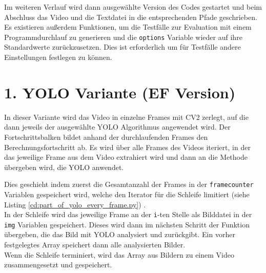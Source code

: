 {	\ifimportant
	
	\fi
	Im weiteren Verlauf wird dann ausgewählte Version des Codes gestartet und beim Abschluss das Video und die Textdatei in die entsprechenden Pfade geschrieben.
	Es existieren außerdem Funktionen, um die Testfälle zur Evaluation mit einem Programmdurchlauf zu generieren und die \lstinline|options| Variable wieder auf ihre Standardwerte zurückzusetzen. Dies ist erforderlich um für Testfälle andere Einstellungen festlegen zu können.
}



\section{1. YOLO Variante (EF Version)} {
	\label{py:YOLO_every_frame}
	In dieser Variante wird das Video in einzelne Frames mit CV2 zerlegt, auf die dann jeweils der ausgewählte YOLO Algorithmus angewendet wird. Der Fortschrittsbalken bildet anhand der durchlaufenden Frames den Berechnungsfortschritt ab. 
	Es wird über alle Frames des Videos iteriert, in der das jeweilige Frame aus dem Video extrahiert wird und dann an die Methode übergeben wird, die YOLO anwendet. 
	\ifimportant
	
	\fi
	Dies geschieht indem zuerst die Gesamtanzahl der Frames in der \lstinline|framecounter| Variablen gespeichert wird, welche den Iterator für die Schleife limitiert \ifimportant (siehe Listing \ref{cd:part_of_yolo_every_frame.py}) \fi . \\ 
	In der Schleife wird das jeweilige Frame an der \lstinline|i|-ten Stelle als Bilddatei in der \lstinline|img| Variablen gespeichert. Dieses wird dann im nächsten Schritt der Funktion übergeben, die das Bild mit YOLO analysiert und zurückgibt. Ein vorher festgelegtes Array speichert dann alle analysierten Bilder. \\ 
	Wenn die Schleife terminiert, wird das Array aus Bildern zu einem Video zusammengesetzt und gespeichert. \\

	\ifimportant
	
	\fi

}
